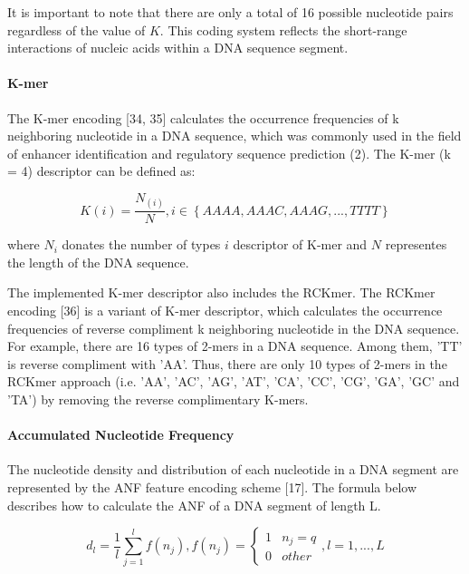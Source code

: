 It is important to note that there are only a total of 16 possible nucleotide pairs regardless of the value of $K$. This coding system reflects the short-range interactions of nucleic acids within a \gls{DNA} sequence segment.

\paragraph{K-mer}

The K-mer encoding [34, 35] calculates the occurrence frequencies of k neighboring nucleotide in a \gls{DNA} sequence, which was commonly used in the field of enhancer identification and regulatory sequence prediction (2). The K-mer (k = 4) descriptor can be defined as:

\begin{equation}\label{eq:K-mer}
    K(i) = \frac{N_{(i)}}{N}, i \in \left\{AAAA, AAAC, AAAG,...,TTTT\right\}
\end{equation}

where $N_{i}$ donates the number of types $i$ descriptor of K-mer and $N$ representes the length of the DNA sequence.

The implemented K-mer descriptor also includes the \gls{RCKmer}. The \gls{RCKmer} encoding [36] is a variant of K-mer descriptor, which calculates the occurrence frequencies of reverse compliment k neighboring nucleotide in the \gls{DNA} sequence. For example, there are 16 types of 2-mers in a \gls{DNA} sequence. Among them, 'TT' is reverse compliment with 'AA'. Thus, there are only 10 types of 2-mers in the \gls{RCKmer} approach (i.e. 'AA', 'AC', 'AG', 'AT', 'CA', 'CC', 'CG', 'GA', 'GC' and 'TA') by removing the reverse complimentary K-mers.

\paragraph{Accumulated Nucleotide Frequency}

The nucleotide density and distribution of each nucleotide in a \gls{DNA} segment are represented by the \gls{ANF} feature encoding scheme [17]. The formula below describes how to calculate the \gls{ANF} of a \gls{DNA} segment of length L.

\begin{equation}\label{eq:ANF}
    d_{l} = \frac{1}{l}\sum_{j=1}^{l}f(n_{j}), f(n_{j}) = \begin{cases}1 & n_{j} = q\\0 & other\end{cases}, l = 1,...,L
\end{equation}

